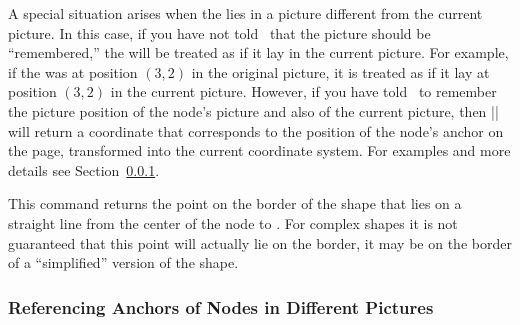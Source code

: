 \begin{command}{\pgfpointanchor{}}
\begin{codeexample}[]
\begin{pgfpicture}
  {
    \pgftransformreset
    \xdef\mycoordinate{\noexpand\pgfpoint{\the\pgf@x}{\the\pgf@y}}
  }

  \pgfpathcircle{\mycoordinate}{2pt}
\end{pgfpicture}
\end{codeexample}

  A special situation arises when the  lies in a picture
  different from the current picture. In this case, if you have not
  told \pgfname\ that the picture should be ``remembered,'' the
   will be treated as if it lay in the current
  picture. For example, if the  was at position $(3,2)$ in
  the original picture, it is treated as if it lay at position
  $(3,2)$ in the current picture. However, if you have told \pgfname\
  to remember the picture position of the node's picture and also of
  the current picture,
  then |\pgfpointanchor| will return a coordinate that corresponds to
  the position of the node's anchor on the page, transformed into the
  current coordinate system. For examples and more details see
  Section~\ref{section-cross-pictures-pgf}.
\end{command}

\begin{command}{\pgfpointshapeborder{}}
  This command returns the point on the border of the shape that lies
  on a straight line from the center of the node to \meta{point}. For
  complex shapes it is not guaranteed that this point will actually
  lie on the border, it may be on the border of a ``simplified''
  version of the shape.

\begin{codeexample}[]
\begin{pgfpicture}
  \begin{pgfscope}
  \end{pgfscope}
  \pgfpathcircle{\pgfpoint{2cm}{1cm}}{2pt}
  \pgfpathcircle{\pgfpoint{-1cm}{1cm}}{2pt}
\end{pgfpicture}
\end{codeexample}
\end{command}


\subsubsection{Referencing Anchors of Nodes in Different Pictures}
\label{section-cross-pictures-pgf}

